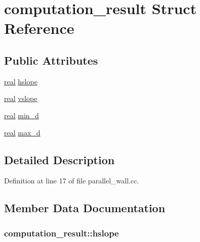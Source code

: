 \hypertarget{structcomputation__result}{}\section{computation\+\_\+result Struct Reference}
\label{structcomputation__result}
\subsection*{Public Attributes}
\begin{DoxyCompactItemize}
\item 
\hyperlink{namespacetlz_a15fd37cce97f2b8b606af18c2615f602}{real} \hyperlink{structcomputation__result_ae24941e3b42203b84391f5daf0b4f08c}{hslope}
\item 
\hyperlink{namespacetlz_a15fd37cce97f2b8b606af18c2615f602}{real} \hyperlink{structcomputation__result_ade1ed4316be9a024f8c5ec120712e591}{vslope}
\item 
\hyperlink{namespacetlz_a15fd37cce97f2b8b606af18c2615f602}{real} \hyperlink{structcomputation__result_aada7e06849adb102b8a848b94c6075b7}{min\+\_\+d}
\item 
\hyperlink{namespacetlz_a15fd37cce97f2b8b606af18c2615f602}{real} \hyperlink{structcomputation__result_a41c81296f3d294b08b21123da60d0f7d}{max\+\_\+d}
\end{DoxyCompactItemize}


\subsection{Detailed Description}


Definition at line 17 of file parallel\+\_\+wall.\+cc.



\subsection{Member Data Documentation}
\subsubsection[{\texorpdfstring{hslope}{hslope}}]{ computation\+\_\+result\+::hslope}\hypertarget{structcomputation__result_ae24941e3b42203b84391f5daf0b4f08c}{}\label{structcomputation__result_ae24941e3b42203b84391f5daf0b4f08c}


